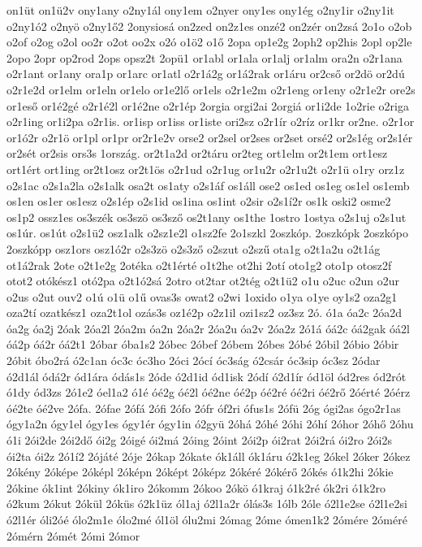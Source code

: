 {on1üt
on1ü2v
ony1any
o2ny1ál
ony1em
o2nyer
ony1es
ony1ég
o2ny1ir
o2ny1it
o2ny1ó2
o2nyö
o2ny1ő2
2onysiosá
on2zed
on2z1es
onzé2
on2zér
on2zsá
2o1o
o2ob
o2of
o2og
o2ol
oo2r
o2ot
oo2x
o2ó
o1ö2
o1ő
2opa
op1e2g
2oph2
op2his
2opl
op2le
2opo
2opr
op2rod
2ops
opsz2t
2opü1
or1abl
or1ala
or1alj
or1alm
ora2n
o2r1ana
o2r1ant
or1any
ora1p
or1arc
or1atl
o2r1á2g
or1á2rak
or1áru
or2cső
or2dö
or2dú
o2r1e2d
or1elm
or1eln
or1elo
or1e2lő
or1els
o2r1e2m
o2r1eng
or1eny
o2r1e2r
ore2s
or1eső
or1é2gé
o2r1é2l
or1é2ne
o2r1ép
2orgia
orgi2ai
2orgiá
or1i2de
1o2rie
o2riga
o2r1ing
or1i2pa
o2r1is.
or1isp
or1iss
or1iste
ori2sz
o2r1ír
o2ríz
or1kr
or2ne.
o2r1or
or1ó2r
o2r1ö
or1pl
or1pr
or2r1e2v
orse2
or2sel
or2ses
or2set
orsé2
or2s1ég
or2s1ér
or2sét
or2sis
ors3s
1ország.
or2t1a2d
or2táru
or2teg
ort1elm
or2t1em
ort1esz
ort1ért
ort1ing
or2t1osz
or2t1ös
o2r1ud
o2r1ug
or1u2r
o2r1u2t
o2r1ü
o1ry
orz1z
o2s1ac
o2s1a2la
o2s1alk
osa2t
os1aty
o2s1áf
os1áll
ose2
os1ed
os1eg
os1el
os1emb
os1en
os1er
os1esz
o2s1ép
o2s1id
os1ina
os1int
o2sir
o2s1í2r
os1k
oski2
osme2
os1p2
ossz1es
os3szék
os3szö
os3sző
os2t1any
os1the
1ostro
1ostya
o2s1uj
o2s1ut
os1úr.
os1út
o2s1ü2
osz1alk
o2sz1e2l
o1sz2fe
2o1szkl
2oszkóp.
2oszkópk
2oszkópo
2oszkópp
osz1ors
osz1ó2r
o2s3zö
o2s3ző
o2szut
o2szű
ota1g
o2t1a2u
o2t1ág
ot1á2rak
2ote
o2t1e2g
2otéka
o2t1érté
o1t2he
ot2hi
2otí
oto1g2
oto1p
otosz2f
otot2
otókész1
otó2pa
o2t1ó2sá
2otro
ot2tar
ot2tég
o2t1ü2
o1u
o2uc
o2un
o2ur
o2us
o2ut
ouv2
o1ú
o1ü
o1ű
ovas3s
owat2
o2wi
1oxido
o1ya
o1ye
oy1s2
oza2g1
oza2tí
ozatkész1
oza2t1ol
ozás3s
oz1é2p
o2z1il
ozi1sz2
oz3sz
2ó.
ó1a
óa2c
2óa2d
óa2g
óa2j
2óak
2óa2l
2óa2m
óa2n
2óa2r
2óa2u
óa2v
2óa2z
2ó1á
óá2c
óá2gak
óá2l
óá2p
óá2r
óá2t1
2óbar
óba1s2
2óbec
2óbef
2óbem
2óbes
2óbé
2óbil
2óbio
2óbir
2óbit
óbo2rá
ó2c1an
óc3c
óc3ho
2óci
2ócí
óc3ság
ó2csár
óc3sip
óc3sz
2ódar
ó2d1ál
ódá2r
ód1ára
ódás1s
2óde
ó2d1id
ód1isk
2ódí
ó2d1ír
ód1öl
ód2res
ód2rót
ó1dy
ód3zs
2ó1e2
óel1a2
ó1é
óé2g
óé2l
óé2ne
óé2p
óé2ré
óé2ri
óé2rő
2óérté
2óérz
óé2te
óé2ve
2ófa.
2ófae
2ófá
2ófi
2ófo
2ófr
óf2ri
ófus1s
2ófü
2óg
ógi2as
ógo2r1as
ógy1a2n
ógy1el
ógy1es
ógy1ér
ógy1in
ó2gyü
2óhá
2óhé
2óhi
2óhí
2óhor
2óhő
2óhu
ó1i
2ói2de
2ói2dő
ói2g
2óigé
ói2má
2óing
2óint
2ói2p
ói2rat
2ói2rá
ói2ro
2ói2s
ói2ta
ói2z
2ó1í2
2ójáté
2óje
2ókap
2ókate
ók1áll
ók1áru
ó2k1eg
2ókel
2óker
2ókez
2ókény
2óképe
2óképl
2óképn
2óképt
2óképz
2ókéré
2ókérő
2ókés
ó1k2hi
2ókie
2ókine
ók1int
2ókiny
ók1iro
2ókomm
2ókoo
2ókö
ó1kraj
ó1k2ré
ók2ri
ó1k2ro
ó2kum
2ókut
2ókül
2óküs
ó2k1üz
ól1aj
ó2l1a2r
ólás3s
1ólb
2óle
ó2l1e2se
ó2l1e2si
ó2l1ér
óli2óé
ólo2m1e
ólo2mé
ól1öl
ólu2mi
2ómag
2óme
ómen1k2
2ómére
2óméré
2ómérn
2ómét
2ómi
2ómor
}
